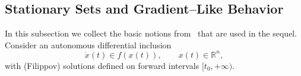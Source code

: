 \documentclass[journal]{IEEEtran}
\begin{document}



\subsection{Stationary Sets and Gradient--Like Behavior}
\label{subsec:YLG-terms}

In this subsection we collect the basic notions from~\cite{YLG} that are
used in the sequel.  Consider an autonomous differential inclusion
\begin{equation}
  \dot x(t) \in f(x(t)), \qquad x(t)\in\mathbb{R}^n,
  \label{eq:aut-incl-prelim}
\end{equation}
with (Filippov) solutions defined on forward intervals $[t_0,+\infty)$.
\end{document}
